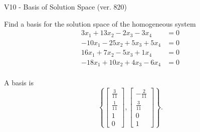\begin{exercise}
  \begin{exerciseTitle}V10 - Basis of Solution Space (ver. 820)\end{exerciseTitle}
  \begin{exerciseStatement}
    Find a basis for the solution space of the homogeneous system 
\begin{align*}
 3 x_ 1 + 13 x_ 2 -2 x_ 3 -3 x_ 4 &= 0  \\ 
  -10 x_ 1 -25 x_ 2 + 5 x_ 3 + 5 x_ 4 &= 0  \\ 
  16 x_ 1 + 7 x_ 2 -5 x_ 3 + 1 x_ 4 &= 0  \\ 
  -18 x_ 1 + 10 x_ 2 + 4 x_ 3 -6 x_ 4 &= 0  \\ 
 \end{align*}


 
  \end{exerciseStatement}

  \begin{exerciseAnswer}
   A basis is   
\[\left\{\left[\begin{array}{c}
\frac{3}{11} \\
\frac{1}{11} \\
1 \\
0
\end{array}\right] , \left[\begin{array}{c}
-\frac{2}{11} \\
\frac{3}{11} \\
0 \\
1
\end{array}\right]\right\}.\]

  


  \end{exerciseAnswer}
\end{exercise}